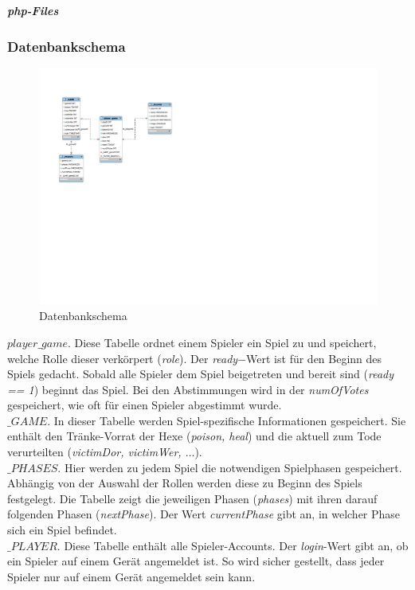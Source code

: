 \documentclass[12pt]{article}
\begin{document}
		\subparagraph{php-Files}


		
		
\subsubsection{Datenbankschema}
		
\begin{figure}[] 
  \centering
     \includegraphics[height = 9 cm, width = 12cm]{DB_Schema}
  \caption{Datenbankschema}
\end{figure}
	

\hspace*{0,7 cm}\textbf{$player\_game.$}
Diese Tabelle ordnet einem Spieler ein Spiel zu und speichert, welche Rolle dieser verkörpert (\textit{role}). Der \textit{ready}$-$Wert ist für den Beginn des Spiels gedacht. Sobald alle Spieler dem Spiel beigetreten und bereit sind (\textit{ready == 1}) beginnt das Spiel. Bei den Abstimmungen wird in der \textit{numOfVotes} gespeichert, wie oft für einen Spieler abgestimmt wurde.
\\

\textbf{$\_GAME.$}
In dieser Tabelle werden Spiel-spezifische Informationen gespeichert. Sie enthält den Tränke-Vorrat der Hexe (\textit{poison, heal}) und die aktuell zum Tode verurteilten (\textit{victimDor, victimWer, $\dots$}).
\\

\textbf{$\_PHASES.$}
Hier werden zu jedem Spiel die notwendigen Spielphasen gespeichert. Abhängig von der Auswahl der Rollen werden diese zu Beginn des Spiels festgelegt. Die Tabelle zeigt die jeweiligen Phasen (\textit{phases}) mit ihren darauf folgenden Phasen (\textit{nextPhase}). Der Wert \textit{currentPhase} gibt an, in welcher Phase sich ein Spiel befindet.
\\

\textbf{$\_PLAYER.$}
Diese Tabelle enthält alle Spieler-Accounts. Der \textit{login}-Wert gibt an, ob ein Spieler auf einem Gerät angemeldet ist. So wird sicher gestellt, dass jeder Spieler nur auf einem Gerät angemeldet sein kann.  
\end{document}
